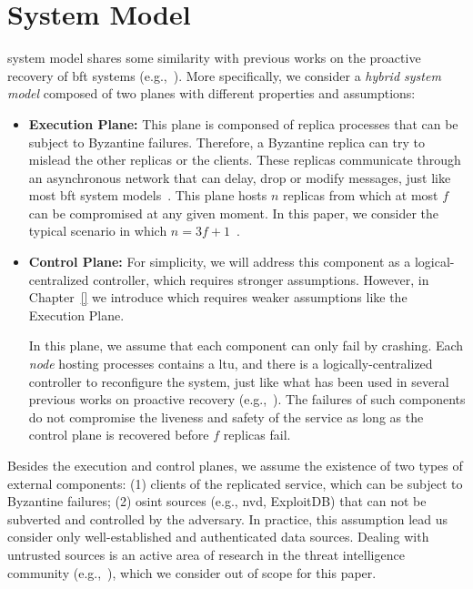\section{System Model}
\label{sec:systemmodel}

\system system model shares some similarity with previous works on the proactive recovery of \gls{bft} systems (e.g.,~\cite{Castro:2002,Platania:2014,Sousa:2010,Roeder:2010}).
More specifically, we consider a \emph{hybrid system model} composed of two planes with different properties and assumptions:

\begin{itemize}

\item \textbf{Execution Plane:} 
This plane is componsed of replica processes that can be subject to Byzantine failures.
Therefore, a Byzantine replica can try to mislead the other replicas or the clients.
These replicas communicate through an asynchronous network that can delay, drop or modify messages, just like most \gls{bft} system models~\cite{Castro:2002,Kotla:2010,Bessani:2014,Aublin:2015}.
This plane hosts $n$ replicas from which at most $f$ can be compromised at any given moment.
In this paper, we consider the typical scenario in which $n=3f+1$~\cite{Castro:2002,Bessani:2008,Moniz:2011,Kotla:2010,Aublin:2015}.  

\item \textbf{Control Plane:}  
For simplicity, we will address this component as a logical-centralized controller, which requires stronger assumptions. 
However, in Chapter~\ref{} we introduce \controller which requires weaker assumptions like the Execution Plane.

In this plane, we assume that each component can only fail by crashing. 
Each \emph{node} hosting processes contains a \gls{ltu}, and there is a logically-centralized controller to reconfigure the system, just like what has been used in several previous works on proactive recovery (e.g.,~\cite{Roeder:2010,Platania:2014,Sousa:2010}).
The failures of such components do not compromise the liveness and safety of the service as long as the control plane is recovered before $f$ replicas fail.


\end{itemize}

Besides the execution and control planes, we assume the existence of two types of external components: (1) clients of the replicated service, which can be subject to Byzantine failures; (2) \gls{osint} sources (e.g., \gls{nvd}, ExploitDB) that can not be subverted and controlled by the adversary.
In practice, this assumption lead us consider only well-established and authenticated data sources.
Dealing with untrusted sources is an active area of research in the threat intelligence community (e.g.,~\cite{Sabottke:2015,Liu:2015}), which we consider out of scope for this paper.


